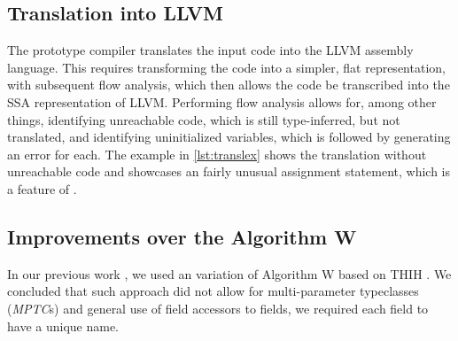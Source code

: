 \subsection{Translation into LLVM}

The prototype compiler translates the input code into the LLVM assembly language. This requires transforming the code into a simpler, flat representation, with subsequent flow analysis, which then allows the code be transcribed into the SSA representation of LLVM. Performing flow analysis allows for, among other things, identifying unreachable code, which is still type-inferred, but not translated, and identifying uninitialized variables, which is followed by generating an error for each. The example in \cref{lst:translex} shows the translation without unreachable code and showcases an fairly unusual assignment statement, which is a feature of \cmm.

\subsection{Improvements over the Algorithm W}

In our previous work \cite{klepl2020type}, we used an variation of Algorithm W based on THIH \cite{jones1999typing}. We concluded that such approach did not allow for multi-parameter typeclasses (\emph{MPTC}s) and general use of field accessors to  fields, we required each field to have a unique name.

